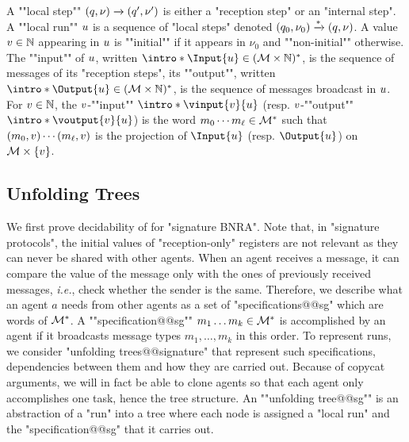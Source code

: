 	\AP A ""local step"" $(q,\nu) \xrightarrow{} (q',\nu')$ is either a "reception step" or an "internal step". 
	\AP A ""local run"" $u$ is a sequence of "local steps" denoted $(q_0, \nu_0) \xrightarrow{*} (q, \nu)$. %
	A value $v \in \mathbb{N}$ appearing in $u$ is ""initial"" if it appears in $\nu_0$ and ""non-initial"" otherwise. 
	The ""input"" of $u$, written $\intro*\Input{\localrun} \in (\messages \times \nats)^*$, is the sequence of messages of its "reception steps", its ""output"", written $\intro*\Output{\localrun} \in (\messages \times \nats)^*$, is the sequence of messages broadcast in $u$. 
	For $v \in \mathbb{N}$, the $v$-""input"" $\intro*\vinput{\aval}{\localrun}$ (resp. $v$-""output"" $\intro*\voutput{\aval}{\localrun}$) is the word $m_0 \cdots m_{\ell} \in \mathcal{M}^*$ such that $(m_0, v) \cdots (m_{\ell}, v)$ is the projection of $\Input{\localrun}$ (resp. $\Output{\localrun}$) on $\mathcal{M} \times \{v\}$.

\subsection{Unfolding Trees}
\label{sec:unfolding_tree_signature}

We first prove decidability of \COVER for "signature BNRA". Note that, in "signature protocols", the initial values of "reception-only" registers are not relevant as they can never be shared with other agents. When an agent receives a message, it can compare the value of the message only with the ones of previously received messages, \emph{i.e.}, check whether the sender is the same. Therefore, we describe what an agent $a$ needs from other agents as a set of "specifications@@sg" which are words of $\mathcal{M}^*$. A ""specification@@sg"" $m_1 \dots m_k \in \mathcal{M}^*$ is accomplished by an agent if it broadcasts message types $m_1, \dots, m_k$ in this order. To represent runs, we consider "unfolding trees@@signature" that represent such specifications, dependencies between them and how they are carried out. Because of copycat arguments, we will in fact be able to clone agents so that each agent only accomplishes one task, hence the tree structure.
An ""unfolding tree@@sg"" is an abstraction of a "run" into a tree where each node is assigned a "local run" and the "specification@@sg" that it carries out. 

